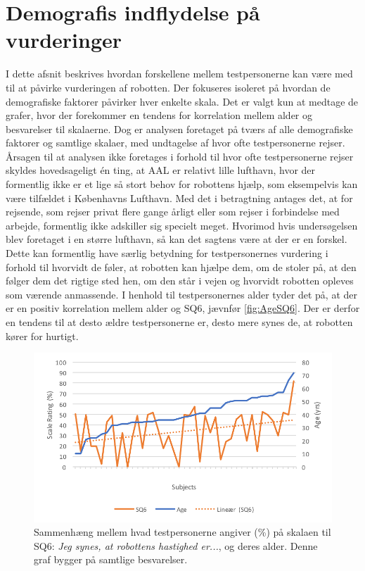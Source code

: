 \section{Demografis indflydelse på vurderinger}
\label{sec:Demografi}
%
I dette afsnit beskrives hvordan forskellene mellem testpersonerne kan være med til at påvirke vurderingen af robotten. Der fokuseres isoleret på hvordan de demografiske faktorer påvirker hver enkelte skala. Det er valgt kun at medtage de grafer, hvor der forekommer en tendens for korrelation mellem alder og besvarelser til skalaerne. Dog er analysen foretaget på tværs af alle demografiske faktorer og samtlige skalaer, med undtagelse af hvor ofte testpersonerne rejser. Årsagen til at analysen ikke foretages i forhold til hvor ofte testpersonerne rejser skyldes hovedsageligt én ting, at AAL er relativt lille lufthavn, hvor der formentlig ikke er et lige så stort behov for robottens hjælp, som eksempelvis kan være tilfældet i Københavns Lufthavn. Med det i betragtning antages det, at for rejsende, som rejser privat flere gange årligt eller som rejser i forbindelse med arbejde, formentlig ikke adskiller sig specielt meget. Hvorimod hvis undersøgelsen blev foretaget i en større lufthavn, så kan det sagtens være at der er en forskel. Dette kan formentlig have særlig betydning for testpersonernes vurdering i forhold til hvorvidt de føler, at robotten kan hjælpe dem, om de stoler på, at den følger dem det rigtige sted hen, om den står i vejen og hvorvidt robotten opleves som værende anmassende.\blankline
% 
I henhold til testpersonernes alder tyder det på, at der er en positiv korrelation mellem alder og SQ6, jævnfør \autoref{fig:AgeSQ6}. Der er derfor en tendens til at desto ældre testpersonerne er, desto mere synes de, at robotten kører for hurtigt. 
%
\begin{figure}[H]
\centering
\includegraphics[width=\textwidth]{Figure/DatabehandlingSkalaer/Demografi/AgeSQ6}
\caption{Sammenhæng mellem hvad testpersonerne angiver (\%) på skalaen til SQ6: \textit{Jeg synes, at robottens hastighed er...}, og deres alder. Denne graf bygger på samtlige besvarelser.}
\label{fig:AgeSQ6}
\end{figure}
